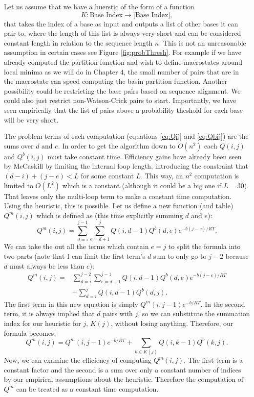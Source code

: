 Let us assume that we have a huerstic of the form of a function 
\begin{equation}
K : \text{Base Index} \to \text{[Base Index]},
\end{equation}
that takes the index of a base as input and outputs a list of other
bases it can pair to, where the length of this list is always very
short and can be considered constant length in relation to the
sequence length $n$. This is not an unreasonable assumption in certain
cases see Figure \ref{fig:probThresh}. For example if we have already
computed the partition function and wish to define macrostates around
local minima as we will do in Chapter 4, the small number of pairs
that are in the macrostate can speed computing the basin partition
function. Another possibility could be restricting the base pairs
based on sequence alignment. We could also just restrict
non-Watson-Crick pairs to start. Importantly, we have seen empirically
that the list of pairs above a probability theshold for each base will
be very short.

The problem terms of each computation (equations \ref{eq:Qij} and
\ref{eq:Qbij}) are the sums over $d$ and $e$. In order to get the
algorithm down to $O(n^2)$ each $Q(i,j)$ and $Q^b(i,j)$ must take
constant time. Efficiency gains have already been seen by McCaskill by
limiting the internal loop length, introducing the constraint that
$(d-i) + (j-e) < L$ for some constant $L$. This way, an $n^2$
computation is limited to $O(L^2)$ which is a constant (although it
could be a big one if $L=30$). That leaves only the multi-loop term to
make a constant time computation. Using the heuristic, this is
possible. Let us define a new function (and table) $Q^m(i, j)$ which
is defined as (this time explicitly summing $d$ and $e$):
\begin{equation}
Q^m(i, j) = \sum_{d = i}^{j-1}\sum_{e = d+1}^{j} Q(i, d-1)Q^b(d,e)e^{-b(j-e)/RT}.
\end{equation}
We can take the out all the terms which contain $e = j$ to split the
formula into two parts (note that I can limit the first term's $d$ sum
to only go to $j-2$ because $d$ must always be less than $e$):
\begin{equation}
\begin{split}
Q^m(i, j) =& \sum_{d = i}^{j-2}\sum_{e = d+1}^{j-1} Q(i, d-1)Q^b(d,e)e^{-b(j-e)/RT} \\
&+ \sum_{d = i}^{j} Q(i, d-1)Q^b(d,j).
\end{split}
\end{equation}
The first term in this new equation is simply
$Q^m(i,j-1)e^{-b/RT}$. In the second term, it is always implied that
$d$ pairs with $j$, so we can substitute the summation index for our
heuristic for $j$, $K(j)$, without losing anything. Therefore, our
formula becomes:
\begin{equation}
Q^m(i, j) = Q^m(i, j -1) e^{-b/RT} + \sum_{k \in K(j)} Q(i, k - 1) Q^b(k, j).
\end{equation}
Now, we can examine the efficiency of computing $Q^m(i,j)$. The first
term is a constant factor and the second is a sum over only a constant
number of indices by our empirical assumptions about the
heuristic. Therefore the computation of $Q^m$ can be treated as a
constant time computation.

